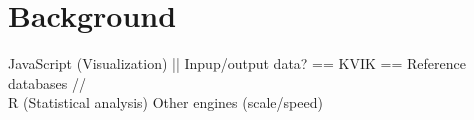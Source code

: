 
\section*{Background}

%
%


%
%
           JavaScript (Visualization)
                       ||
Inpup/output data? == KVIK == Reference databases
                    //   \\
R (Statistical analysis)  Other engines (scale/speed)

